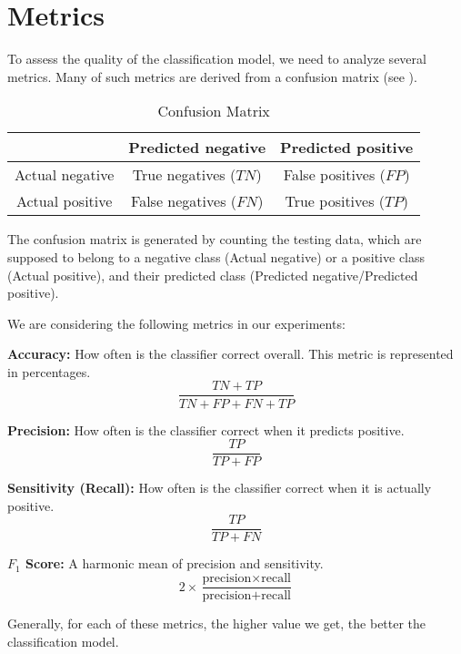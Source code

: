 \section{Metrics}
To assess the quality of the classification model, we need to analyze several metrics. Many of such metrics are derived from a confusion matrix (see ).
\begin{table}[ht]
    \centering
    \begin{tabular}{|c|c|c|}
        \hline
        & Predicted negative & Predicted positive \\ 
        \hline 
        Actual negative & True negatives ($TN$) & False positives ($FP$) \\ 
        \hline
        Actual positive & False negatives ($FN$) & True positives ($TP$)  \\ 
        \hline
    \end{tabular}
    \caption{Confusion Matrix}
    \label{tab:confusion_matrix}
\end{table}
The confusion matrix is generated by counting the testing data, which are supposed to belong to a negative class (Actual negative) or a positive class (Actual positive), and their predicted class (Predicted negative/Predicted positive).

We are considering the following metrics in our experiments:
\begin{description}
    \item{\textbf{Accuracy:}} How often is the classifier correct overall. This metric is represented in percentages.
    \begin{equation}
        \frac{TN+TP}{TN+FP+FN+TP}
        \label{eq:svm:accuracy}
    \end{equation}
    \item{\textbf{Precision:}} How often is the classifier correct when it predicts positive.
    \begin{equation}
        \frac{TP}{TP+FP}
        \label{eq:svm:precision}
    \end{equation}
    \item{\textbf{Sensitivity (Recall):}} How often is the classifier correct when it is actually positive.
    \begin{equation}
        \frac{TP}{TP+FN}
        \label{eq:svm:sensitivity}
    \end{equation}
    \item{\textbf{\( F_1 \) Score:}} A harmonic mean of precision and sensitivity.
    \begin{equation}
        2\times\frac{\text{precision}\times\text{recall}}{\text{precision}+\text{recall}}
        \label{eq:svm:F1}
    \end{equation}
\end{description}

Generally, for each of these metrics, the higher value we get, the better the classification model.
